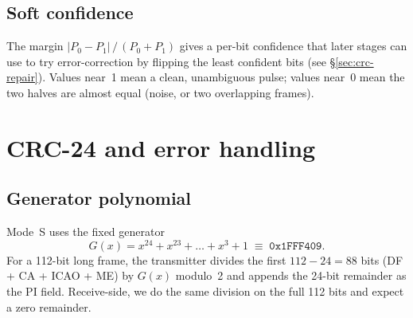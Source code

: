 \documentclass[11pt,a4paper]{article}
\begin{document}
\subsection{Soft confidence}

The margin $|P_0 - P_1| \,/\, (P_0 + P_1)$ gives a per-bit confidence
that later stages can use to try error-correction by flipping the least
confident bits (see \S\ref{sec:crc-repair}).  Values near~1 mean a
clean, unambiguous pulse; values near~0 mean the two halves are almost
equal (noise, or two overlapping frames).

\begin{center}
\end{center}

\section{CRC-24 and error handling}\label{sec:crc}

\subsection{Generator polynomial}

Mode~S uses the fixed generator
\begin{equation}
G(x) = x^{24} + x^{23} + \ldots + x^{3} + 1
     \;\equiv\; \texttt{0x1FFF409}.
\end{equation}
For a 112-bit long frame, the transmitter divides the first
$112-24 = 88$ bits (DF + CA + ICAO + ME) by $G(x)$ modulo~2 and
appends the 24-bit remainder as the PI field.  Receive-side, we do
the same division on the full 112 bits and expect a zero remainder.
\end{document}

